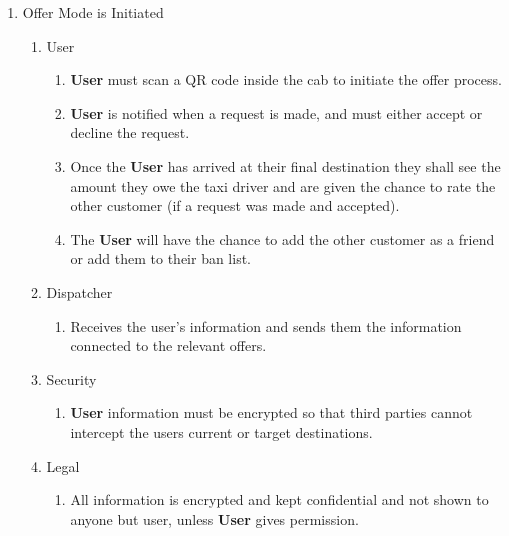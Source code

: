 \documentclass[english]{article}
\begin{document}
\begin{enumerate}[{BE}1.]
	\item Offer	Mode is Initiated	
	\begin{enumerate}[{VP5}.1]
		\item User
			\begin{enumerate}
				\item \textbf{User} must scan a QR code inside the cab to initiate the offer process.
				\item \textbf{User} is notified when a request is made, and must either accept or decline the request.
				\item Once the \textbf{User} has arrived at their final destination they shall see the amount they owe the taxi driver and are given the chance to rate the other customer (if a request was made and accepted).
				\item The \textbf{User} will have the chance to add the other customer as a friend or add them to their ban list.
			\end{enumerate}
		\item Dispatcher
			\begin{enumerate}
				\item Receives the user's information and sends them the information connected to the relevant offers.
			\end{enumerate}
		\item Security
			\begin{enumerate}
				\item \textbf{User} information must be encrypted so that third parties cannot intercept the users current or target destinations.
			\end{enumerate}
		\item Legal
			\begin{enumerate}
				\item All information is encrypted and kept confidential and not shown to anyone but user, unless \textbf{User} gives permission.
			\end{enumerate}
	\end{enumerate}


\end{enumerate}
\end{document}
